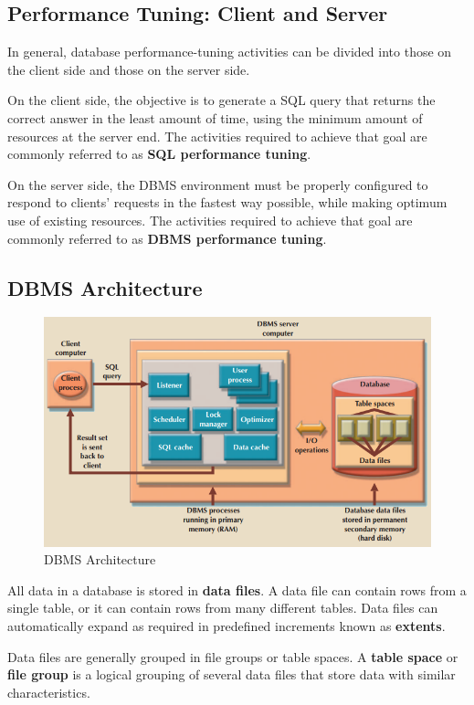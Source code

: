 \documentclass[a4paper, 11pt, titlepage]{report}
\begin{document}
\subsection{Performance Tuning: Client and Server}
In general, database performance-tuning activities can be divided into those on the client side and those on the server side.

On the client side, the objective is to generate a SQL query that returns the correct answer in the least amount of time, using the minimum amount of resources at the server end. The activities required to achieve that goal are commonly referred to as \textbf{SQL performance tuning}.

On the server side, the DBMS environment must be properly configured to respond to clients' requests in the fastest way possible, while making optimum use of existing resources. The activities required to achieve that goal are commonly referred to as \textbf{DBMS performance tuning}.
\subsection{DBMS Architecture}
\begin{figure}[H]
\centering
\includegraphics[scale=0.6]{pics/arch}
\caption{DBMS Architecture}
\end{figure}
All data in a database is stored in \textbf{data files}. A data file can contain rows from a single table, or it can contain rows from many different tables. Data files can automatically expand as required in predefined increments known as \textbf{extents}.

Data files are generally grouped in file groups or table spaces. A \textbf{table space} or \textbf{file group} is a logical grouping of several data files that store data with similar characteristics.
\end{document}
